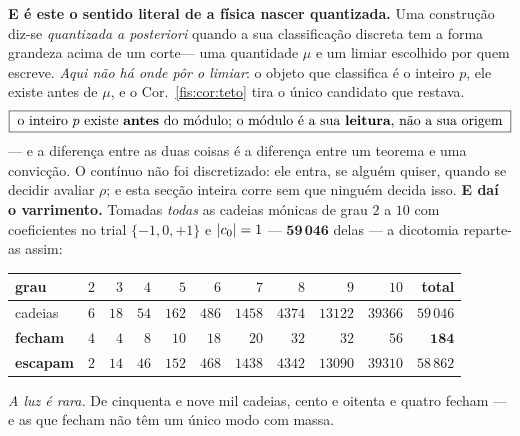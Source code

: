 \documentclass[livro.tex]{subfiles}
\begin{document}
\medskip\noindent\textbf{E é este o sentido literal de a física nascer
quantizada.} Uma construção diz-se \emph{quantizada a posteriori} quando a sua
classificação discreta tem a forma \guilsinglleft grandeza acima de um
corte\guilsinglright --- uma quantidade $\mu$ e um limiar escolhido por quem
escreve. \emph{Aqui não há onde pôr o limiar}: o objeto que classifica é o
inteiro $p$, ele existe antes de $\mu$, e o Cor.~\ref{fis:cor:teto} tira o único
candidato que restava.
\[
\boxed{\;\text{o inteiro }p\text{ existe \textbf{antes} do módulo;
o módulo é a sua \textbf{leitura}, não a sua origem}\;}
\]
--- e a diferença entre as duas coisas é a diferença entre um teorema e uma
convicção. O contínuo não foi discretizado: ele entra, se alguém quiser, quando
se decidir avaliar $\rho$; e esta secção inteira corre sem que ninguém decida
isso.
\medskip\noindent\textbf{E daí o varrimento.} Tomadas \emph{todas} as cadeias
mónicas de grau $2$ a $10$ com coeficientes no trial $\{-1,0,+1\}$ e
$\lvert c_0\rvert=1$ --- $\mathbf{59\,046}$ delas --- a dicotomia reparte-as assim:
\begin{center}\small
\begin{tabular}{@{}lrrrrrrrrrr@{}}
\toprule
grau & $2$ & $3$ & $4$ & $5$ & $6$ & $7$ & $8$ & $9$ & $10$ & total \\
\midrule
cadeias & $6$ & $18$ & $54$ & $162$ & $486$ & $1458$ & $4374$ & $13122$ & $39366$ & $59\,046$ \\
\textbf{fecham} & $4$ & $4$ & $8$ & $10$ & $18$ & $20$ & $32$ & $32$ & $56$ & $\mathbf{184}$ \\
\textbf{escapam} & $2$ & $14$ & $46$ & $152$ & $468$ & $1438$ & $4342$ & $13090$ & $39310$ & $58\,862$ \\
\bottomrule
\end{tabular}
\end{center}

\noindent\emph{A luz é rara.} De cinquenta e nove mil cadeias, cento e oitenta e
quatro fecham --- e as que fecham não têm um único modo com massa.

\end{document}

